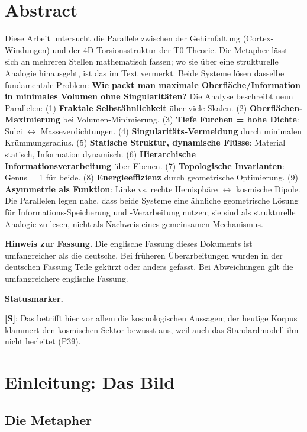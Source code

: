 \section*{Abstract}
		Diese Arbeit untersucht die Parallele zwischen der Gehirnfaltung (Cortex-Windungen) und der 4D-Torsionsstruktur der T0-Theorie. Die Metapher lässt sich an mehreren Stellen mathematisch fassen; wo sie über eine strukturelle Analogie hinausgeht, ist das im Text vermerkt. Beide Systeme lösen dasselbe fundamentale Problem: \textbf{Wie packt man maximale Oberfläche/Information in minimales Volumen ohne Singularitäten?} Die Analyse beschreibt neun Parallelen: (1) \textbf{Fraktale Selbstähnlichkeit} über viele Skalen. (2) \textbf{Oberflächen-Maximierung} bei Volumen-Minimierung. (3) \textbf{Tiefe Furchen = hohe Dichte}: Sulci $\leftrightarrow$ Masseverdichtungen. (4) \textbf{Singularitäts-Vermeidung} durch minimalen Krümmungsradius. (5) \textbf{Statische Struktur, dynamische Flüsse}: Material statisch, Information dynamisch. (6) \textbf{Hierarchische Informationsverarbeitung} über Ebenen. (7) \textbf{Topologische Invarianten}: Genus = 1 für beide. (8) \textbf{Energieeffizienz} durch geometrische Optimierung. (9) \textbf{Asymmetrie als Funktion}: Linke vs. rechte Hemisphäre $\leftrightarrow$ kosmische Dipole. Die Parallelen legen nahe, dass beide Systeme eine ähnliche geometrische Lösung für Informations-Speicherung und -Verarbeitung nutzen; sie sind als strukturelle Analogie zu lesen, nicht als Nachweis eines gemeinsamen Mechanismus.

	\medskip\noindent\textbf{Hinweis zur Fassung.} Die englische Fassung dieses Dokuments ist umfangreicher als die deutsche. Bei früheren Überarbeitungen wurden in der deutschen Fassung Teile gekürzt oder anders gefasst. Bei Abweichungen gilt die umfangreichere englische Fassung.


	\medskip\noindent\textbf{Statusmarker.}
	

	\noindent \textbf{[S]}: Das betrifft hier vor allem die kosmologischen Aussagen; der heutige Korpus klammert den kosmischen Sektor bewusst aus, weil auch das Standardmodell ihn nicht herleitet (P39).




	\section{Einleitung: Das Bild}

	\subsection{Die Metapher}

